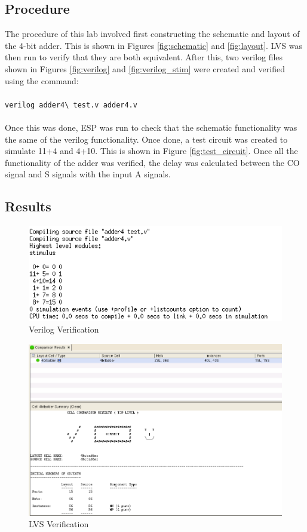 \documentclass[12pt]{article}
\begin{document}
\subsection{Procedure}
The procedure of this lab involved first constructing the schematic and layout of the 4-bit adder. This is shown in Figures \ref{fig:schematic} and \ref{fig:layout}. LVS was then run to verify that they are both equivalent. After this, two verilog files shown in Figures \ref{fig:verilog} and \ref{fig:verilog_stim} were created and verified using the command: \\ ~\\ \texttt{verilog adder4\textbackslash\  test.v adder4.v} \\ ~\\
Once this was done, ESP was run to check that the schematic functionality was the same of the verilog functionality. Once done, a test circuit was created to simulate 11+4 and 4+10. This is shown in Figure \ref{fig:test_circuit}. Once all the functionality of the adder was verified, the delay was calculated between the CO signal and S signals with the input A signals.
\subsection{Results}
\begin{figure}[H]
\centering
\includegraphics[width=1\linewidth]{verilog_verification}
\caption{Verilog Verification}
\label{fig:verilog_verification}
\end{figure}

\begin{figure}[H]
\centering
\includegraphics[width=1\linewidth]{LVS}
\caption{LVS Verification}
\label{fig:LVS}
\end{figure}
\end{document}
